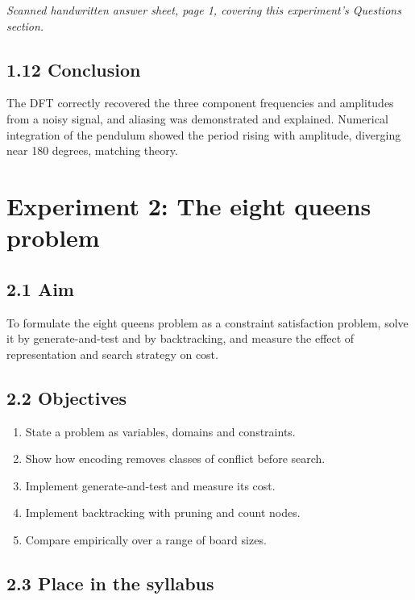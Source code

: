\documentclass[
]{article}
\providecommand{\tightlist}{%
  \setlength{\itemsep}{0pt}\setlength{\parskip}{0pt}}
\begin{document}
\emph{Scanned handwritten answer sheet, page 1, covering this
experiment's Questions section.}

\subsection{1.12 Conclusion}\label{conclusion}

The DFT correctly recovered the three component frequencies and
amplitudes from a noisy signal, and aliasing was demonstrated and
explained. Numerical integration of the pendulum showed the period
rising with amplitude, diverging near 180 degrees, matching theory.

\section{Experiment 2: The eight queens
problem}\label{experiment-2-the-eight-queens-problem}

\subsection{2.1 Aim}\label{aim-1}

To formulate the eight queens problem as a constraint satisfaction
problem, solve it by generate-and-test and by backtracking, and measure
the effect of representation and search strategy on cost.

\subsection{2.2 Objectives}\label{objectives-1}

\begin{enumerate}
\def\labelenumi{\arabic{enumi}.}
\tightlist
\item
  State a problem as variables, domains and constraints.
\item
  Show how encoding removes classes of conflict before search.
\item
  Implement generate-and-test and measure its cost.
\item
  Implement backtracking with pruning and count nodes.
\item
  Compare empirically over a range of board sizes.
\end{enumerate}

\subsection{2.3 Place in the syllabus}\label{place-in-the-syllabus-1}
\end{document}
